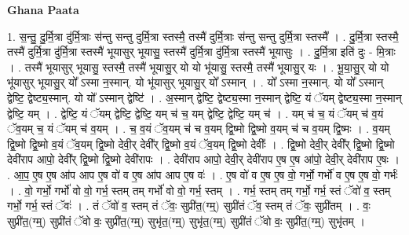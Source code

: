 \documentclass[17pt]{extarticle}
\begin{document}
\textbf{Ghana Paata } \newline

1. स॒न्तु॒ दु॒र्मि॒त्रा दु॑र्मि॒त्राः स॑न्तु सन्तु दुर्मि॒त्रा स्तस्मै॒ तस्मै॑ दुर्मि॒त्राः स॑न्तु सन्तु दुर्मि॒त्रा स्तस्मै᳚ । . दु॒र्मि॒त्रा स्तस्मै॒ तस्मै॑ दुर्मि॒त्रा दु॑र्मि॒त्रा स्तस्मै॑ भूयासुर् भूयासु॒ स्तस्मै॑ दुर्मि॒त्रा दु॑र्मि॒त्रा स्तस्मै॑ भूयासुः । . दु॒र्मि॒त्रा इति॑ दुः - मि॒त्राः । . तस्मै॑ भूयासुर् भूयासु॒ स्तस्मै॒ तस्मै॑ भूयासु॒र् यो यो भू॑यासु॒ स्तस्मै॒ तस्मै॑ भूयासु॒र् यः । . भू॒या॒सु॒र् यो यो भू॑यासुर् भूयासु॒र् यो᳚ ऽस्मा न॒स्मान्. यो भू॑यासुर् भूयासु॒र् यो᳚ ऽस्मान् । . यो᳚ ऽस्मा न॒स्मान्. यो यो᳚ ऽस्मान् द्वेष्टि॒ द्वेष्ट्य॒स्मान्. यो यो᳚ ऽस्मान् द्वेष्टि॑ । . अ॒स्मान् द्वेष्टि॒ द्वेष्ट्य॒स्मा न॒स्मान् द्वेष्टि॒ यं ॅयम् द्वेष्ट्य॒स्मा न॒स्मान् द्वेष्टि॒ यम् । . द्वेष्टि॒ यं ॅयम् द्वेष्टि॒ द्वेष्टि॒ यम् च॑ च॒ यम् द्वेष्टि॒ द्वेष्टि॒ यम् च॑ । . यम् च॑ च॒ यं ॅयम् च॑ व॒यं ॅव॒यम् च॒ यं ॅयम् च॑ व॒यम् । . च॒ व॒यं ॅव॒यम् च॑ च व॒यम् द्वि॒ष्मो द्वि॒ष्मो व॒यम् च॑ च व॒यम् द्वि॒ष्मः । . व॒यम् द्वि॒ष्मो द्वि॒ष्मो व॒यं ॅव॒यम् द्वि॒ष्मो देवी॒र् देवी᳚र् द्वि॒ष्मो व॒यं ॅव॒यम् द्वि॒ष्मो देवीः᳚ । . द्वि॒ष्मो देवी॒र् देवी᳚र् द्वि॒ष्मो द्वि॒ष्मो देवी॑राप आपो॒ देवी᳚र् द्वि॒ष्मो द्वि॒ष्मो देवी॑रापः । . देवी॑राप आपो॒ देवी॒र् देवी॑राप ए॒ष ए॒ष आ॑पो॒ देवी॒र् देवी॑राप ए॒षः । . आ॒प॒ ए॒ष ए॒ष आ॑प आप ए॒ष वो॑ व ए॒ष आ॑प आप ए॒ष वः॑ । . ए॒ष वो॑ व ए॒ष ए॒ष वो॒ गर्भो॒ गर्भो॑ व ए॒ष ए॒ष वो॒ गर्भः॑ । . वो॒ गर्भो॒ गर्भो॑ वो वो॒ गर्भ॒ स्तम् तम् गर्भो॑ वो वो॒ गर्भ॒ स्तम् । . गर्भ॒ स्तम् तम् गर्भो॒ गर्भ॒ स्तं ॅवो॑ व॒ स्तम् गर्भो॒ गर्भ॒ स्तं ॅवः॑ । . तं ॅवो॑ व॒ स्तम् तं ॅवः॒ सुप्री॑त॒(ग्म्॒) सुप्री॑तं ॅव॒ स्तम् तं ॅवः॒ सुप्री॑तम् । . वः॒ सुप्री॑त॒(ग्म्॒) सुप्री॑तं ॅवो वः॒ सुप्री॑त॒(ग्म्॒) सुभृ॑त॒(ग्म्॒) सुभृ॑त॒(ग्म्॒) सुप्री॑तं ॅवो वः॒ सुप्री॑त॒(ग्म्॒) सुभृ॑तम् । \newline
\end{document}
